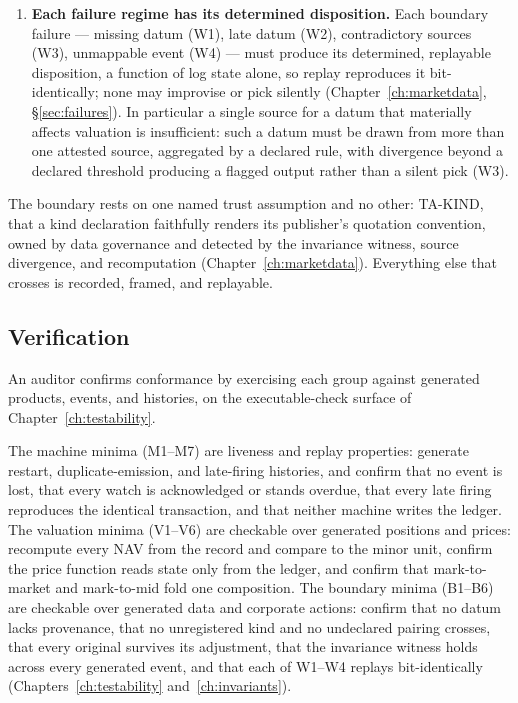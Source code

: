 \begin{enumerate}[label=\textbf{B\arabic*.}, ref=B\arabic*, leftmargin=*, itemsep=3pt]
  the value frame and the move on the quantity must be bound so that total value is
  invariant across the event; a stale-frame read --- a new count against an old price ---
  or a wrong-side-of-ex read must be refused
  (Chapter~\ref{ch:marketdata}, \S\ref{sec:witness}). This is the ingestion-side
  enforcement of requirement~V4.
\item \textbf{Each failure regime has its determined disposition.} Each boundary failure
  --- missing datum (W1), late datum (W2), contradictory sources (W3), unmappable event
  (W4) --- must produce its determined, replayable disposition, a function of log state
  alone, so replay reproduces it bit-identically; none may improvise or pick silently
  (Chapter~\ref{ch:marketdata}, \S\ref{sec:failures}). In particular a single source for a
  datum that materially affects valuation is insufficient: such a datum must be drawn from
  more than one attested source, aggregated by a declared rule, with divergence beyond a
  declared threshold producing a flagged output rather than a silent pick (W3).
\end{enumerate}

The boundary rests on one named trust assumption and no other: TA-KIND, that a kind
declaration faithfully renders its publisher's quotation convention, owned by data
governance and detected by the invariance witness, source divergence, and recomputation
(Chapter~\ref{ch:marketdata}). Everything else that crosses is recorded, framed, and
replayable.

\subsection{Verification}

An auditor confirms conformance by exercising each group against generated products,
events, and histories, on the executable-check surface of Chapter~\ref{ch:testability}.

The machine minima (M1--M7) are liveness and replay properties: generate restart,
duplicate-emission, and late-firing histories, and confirm that no event is lost, that
every watch is acknowledged or stands overdue, that every late firing reproduces the
identical transaction, and that neither machine writes the ledger. The valuation minima
(V1--V6) are checkable over generated positions and prices: recompute every NAV from the
record and compare to the minor unit, confirm the price function reads state only from the
ledger, and confirm that mark-to-market and mark-to-mid fold one composition. The boundary
minima (B1--B6) are checkable over generated data and corporate actions: confirm that no
datum lacks provenance, that no unregistered kind and no undeclared pairing crosses, that
every original survives its adjustment, that the invariance witness holds across every
generated event, and that each of W1--W4 replays bit-identically
(Chapters~\ref{ch:testability} and~\ref{ch:invariants}).

